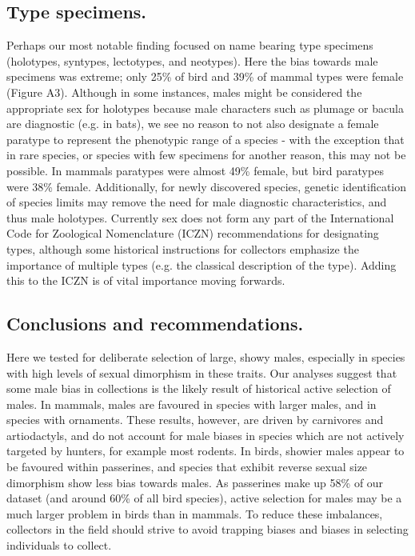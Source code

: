 \documentclass[a4paper, 12pt]{article}
\begin{document}
\subsection{Type specimens.} 
Perhaps our most notable finding focused on name bearing type specimens (holotypes, syntypes, lectotypes, and neotypes). 
Here the bias towards male specimens was extreme; only 25\% of bird and 39\% of mammal types were female (Figure A3). 
Although in some instances, males might be considered the appropriate sex for holotypes because male characters such as plumage or bacula are diagnostic (e.g. in bats\cite{bacula}), we see no reason to not also designate a female paratype to represent the phenotypic range of a species - with the exception that in rare species, or species with few specimens for another reason, this may not be possible.
In mammals paratypes were almost 49\% female, but bird paratypes were 38\% female. 
Additionally, for newly discovered species, genetic identification of species limits may remove the need for male diagnostic characteristics, and thus male holotypes. 
Currently sex does not form any part of the International Code for Zoological Nomenclature (ICZN) recommendations for designating types, although some historical instructions for collectors emphasize the importance of multiple types (e.g. the classical description of the type\cite{schuchert1897type}). 
Adding this to the ICZN is of vital importance moving forwards.

\subsection{Conclusions and recommendations.}
Here we tested for deliberate selection of large, showy males, especially in species with high levels of sexual dimorphism in these traits.
Our analyses suggest that some male bias in collections is the likely result of historical active selection of males.
In mammals, males are favoured in species with larger males, and in species with ornaments. 
These results, however, are driven by carnivores and artiodactyls, and do not account for male biases in species which are not actively targeted by hunters, for example most rodents. 
In birds, showier males appear to be favoured within passerines, and species that exhibit reverse sexual size dimorphism show less bias towards males.
As passerines make up 58\% of our dataset (and around 60\% of all bird species), active selection for males may be a much larger problem in birds than in mammals.
To reduce these imbalances, collectors in the field should strive to avoid trapping biases and biases in selecting individuals to collect.
\end{document}
